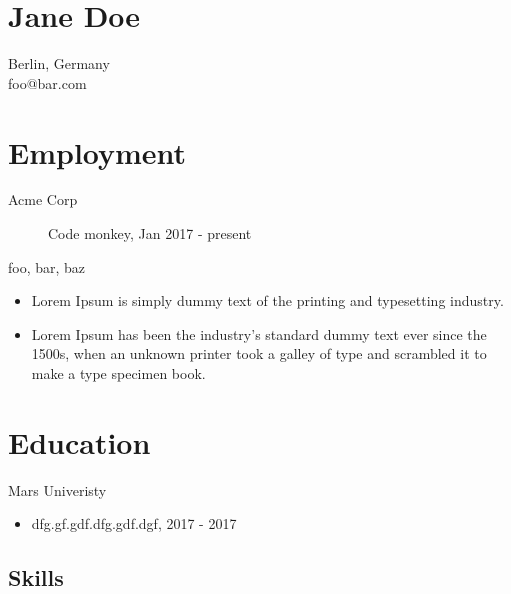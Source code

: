 \documentclass[10pt]{article}
\begin{document}
  
    \section{Jane Doe}
    Berlin, Germany\\
    foo@bar.com



\begin{paracol}{2}
\begin{leftcolumn}
\section{Employment}

\begin{description}
    \item [Acme Corp] Code monkey, Jan 2017 - present
    \item [\footnotesize{
     foo,  bar,  baz 
    }]
\end{description}
\begin{itemize}
    
    \item Lorem Ipsum is simply dummy text of the printing and typesetting industry.
    
    \item Lorem Ipsum has been the industry's standard dummy text ever since the 1500s, when an unknown printer took a galley of type and scrambled it to make a type specimen book.
    
\end{itemize}

\section{Education}

\begin{description}
    \item [Mars Univeristy]
\end{description}
\begin{itemize}
    \item dfg.gf.gdf.dfg.gdf.dgf, 2017 - 2017
\end{itemize}

\end{leftcolumn}

\begin{rightcolumn}
\section{Skills}


\end{rightcolumn}
\end{paracol}
\end{document}
